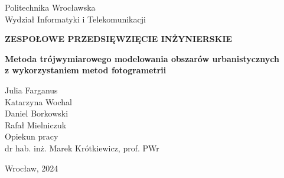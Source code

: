\begin{titlepage}
    \begin{center}
        \Large
        Politechnika Wrocławska\\
        Wydział Informatyki i Telekomunikacji\\
        \vspace*{1cm}
            
        \Huge
        \textbf{ZESPOŁOWE PRZEDSIĘWZIĘCIE INŻYNIERSKIE}

        \vspace{1.5cm}
        \huge
        \textbf{Metoda trójwymiarowego modelowania obszarów urbanistycznych \\z wykorzystaniem metod fotogrametrii}

        \vspace{1.5cm}
        \LARGE
        Julia Farganus\\
        Katarzyna Wochal\\
        Daniel Borkowski\\
        Rafał Mielniczuk\\

        \vspace{1.5cm}
        Opiekun pracy\\
        dr hab. inż. Marek Krótkiewicz, prof. PWr

        \vfill
            
            
        \vspace{0.8cm}
            
            
        \Large
        Wrocław, 2024
        
            
    \end{center}
\end{titlepage}